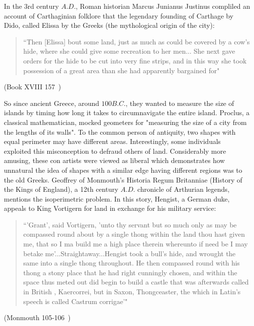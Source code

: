 \documentclass[a4paper]{book}
\begin{document}
In the 3rd century $A.D.$, Roman historian Marcus Junianus Justinus compliled an account of Carthaginian folklore that the legendary founding of Carthage by Dido, called Elissa by the Greeks (the mythological origin of the city):
\begin{center}
    \begin{quote}
        ``Then [Elissa] bout some land, just as much as could be covered by a cow's hide, where she could give some recreation to her men... She next gave orders for the hide to be cut into very fine strips, and in this way she took possession of a great area than she had apparently bargained for"
    \end{quote}
    (Book XVIII 157~\cite{yardley1994justin})
\end{center}

So since ancient Greece, around $100B.C.$, they wanted to measure the size of islands by timing how long it takes to circumnavigate the entire island. Proclus, a classical mathematician, mocked geometers for "measuring the size of a city from the lengths of its walls". To the common person of antiquity, two shapes with equal perimeter may have different areas. Interestingly, some individuals exploited this misconception to defraud others of land. Considerably more amusing, these con artists were viewed as liberal which demonstrates how unnatural the idea of shapes with a similar edge having different regions was to the old Greeks.
\newline
\newline
Geoffrey of Monmouth's Historia Regum Britanniae (History of the Kings of England), a 12th century $A.D.$ chronicle of Arthurian legends, mentions the isoperimetric problem. In this story, Hengist, a German duke, appeals to King Vortigern for land in exchange for his military service:
\begin{center}
    \begin{quote}
        ``'Grant', said Vortigern, 'unto thy servant but so much only as may be compassed round about by a single thong within the land thou hast given me, that so I ma build me a high place therein whereunto if need be I may betake me’...Straightaway...Hengist took a bull’s hide, and wrought the same into a single thong throughout. He then compassed round with his thong a stony place that he had right cunningly chosen, and within the space thus meted out did begin to build a castle that was afterwards called in British , Kaercorrei, but in Saxon, Thongceaster, the which in Latin’s speech is called Castrum corrigae'"
    \end{quote}
    (Monmouth 105-106~\cite{evans1920histories})
\end{center}
\end{document}
